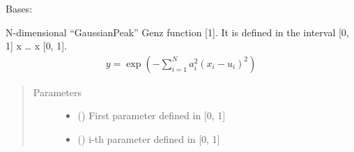 \documentclass[letterpaper,10pt,english,openany,oneside]{sphinxmanual}
\begin{document}

\begin{fulllineitems}
\label{\detokenize{pygpc.testfunctions:pygpc.testfunctions.testfunctions.GenzGaussianPeak}}
Bases: {\hyperref[\detokenize{pygpc:pygpc.AbstractModel.AbstractModel}]{}}

N-dimensional “GaussianPeak” Genz function {[}1{]}. It is defined in the interval {[}0, 1{]} x … x {[}0, 1{]}.
\begin{equation*}
\begin{split}y = \exp\left( - \sum_{i=1}^{N} a_i ^2 (x_i - u_i)^2\right)\end{split}
\end{equation*}\begin{quote}\begin{description}
\item[{Parameters}] \leavevmode\begin{itemize}
\item {} 
\sphinxstyleliteralstrong{\sphinxupquote{{[}}}\sphinxstyleliteralstrong{\sphinxupquote{{]}}} (\sphinxstyleliteralemphasis{\sphinxupquote{ {[}}}\sphinxstyleliteralemphasis{\sphinxupquote{{]}}}) \textendash{} First parameter defined in {[}0, 1{]}

\item {} 
\sphinxstyleliteralstrong{\sphinxupquote{{[}}}\sphinxstyleliteralstrong{\sphinxupquote{{]}}} (\sphinxstyleliteralemphasis{\sphinxupquote{ {[}}}\sphinxstyleliteralemphasis{\sphinxupquote{{]}}}) \textendash{} i-th parameter defined in {[}0, 1{]}


\end{itemize}
\end{description}
\end{quote}
\end{fulllineitems}
\end{document}
